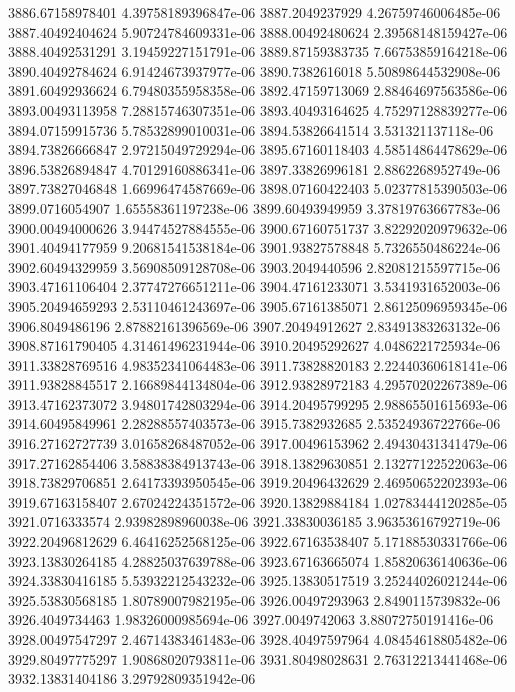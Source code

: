 {3886.67158978401 4.39758189396847e-06
3887.2049237929 4.26759746006485e-06
3887.40492404624 5.90724784609331e-06
3888.00492480624 2.39568148159427e-06
3888.40492531291 3.19459227151791e-06
3889.87159383735 7.66753859164218e-06
3890.40492784624 6.91424673937977e-06
3890.7382616018 5.50898644532908e-06
3891.60492936624 6.79480355958358e-06
3892.47159713069 2.88464697563586e-06
3893.00493113958 7.28815746307351e-06
3893.40493164625 4.75297128839277e-06
3894.07159915736 5.78532899010031e-06
3894.53826641514 3.531321137118e-06
3894.73826666847 2.97215049729294e-06
3895.67160118403 4.58514864478629e-06
3896.53826894847 4.70129160886341e-06
3897.33826996181 2.8862268952749e-06
3897.73827046848 1.66996474587669e-06
3898.07160422403 5.02377815390503e-06
3899.0716054907 1.65558361197238e-06
3899.60493949959 3.37819763667783e-06
3900.00494000626 3.94474527884555e-06
3900.67160751737 3.82292020979632e-06
3901.40494177959 9.20681541538184e-06
3901.93827578848 5.7326550486224e-06
3902.60494329959 3.56908509128708e-06
3903.2049440596 2.82081215597715e-06
3903.47161106404 2.37747276651211e-06
3904.47161233071 3.5341931652003e-06
3905.20494659293 2.53110461243697e-06
3905.67161385071 2.86125096959345e-06
3906.8049486196 2.87882161396569e-06
3907.20494912627 2.83491383263132e-06
3908.87161790405 4.31461496231944e-06
3910.20495292627 4.0486221725934e-06
3911.33828769516 4.98352341064483e-06
3911.73828820183 2.22440360618141e-06
3911.93828845517 2.16689844134804e-06
3912.93828972183 4.29570202267389e-06
3913.47162373072 3.94801742803294e-06
3914.20495799295 2.98865501615693e-06
3914.60495849961 2.28288557403573e-06
3915.7382932685 2.53524936722766e-06
3916.27162727739 3.01658268487052e-06
3917.00496153962 2.49430431341479e-06
3917.27162854406 3.58838384913743e-06
3918.13829630851 2.13277122522063e-06
3918.73829706851 2.64173393950545e-06
3919.20496432629 2.46950652202393e-06
3919.67163158407 2.67024224351572e-06
3920.13829884184 1.02783444120285e-05
3921.0716333574 2.93982898960038e-06
3921.33830036185 3.96353616792719e-06
3922.20496812629 6.46416252568125e-06
3922.67163538407 5.17188530331766e-06
3923.13830264185 4.28825037639788e-06
3923.67163665074 1.85820636140636e-06
3924.33830416185 5.53932212543232e-06
3925.13830517519 3.25244026021244e-06
3925.53830568185 1.80789007982195e-06
3926.00497293963 2.8490115739832e-06
3926.4049734463 1.98326000985694e-06
3927.0049742063 3.88072750191416e-06
3928.00497547297 2.46714383461483e-06
3928.40497597964 4.08454618805482e-06
3929.80497775297 1.90868020793811e-06
3931.80498028631 2.76312213441468e-06
3932.13831404186 3.29792809351942e-06
}
